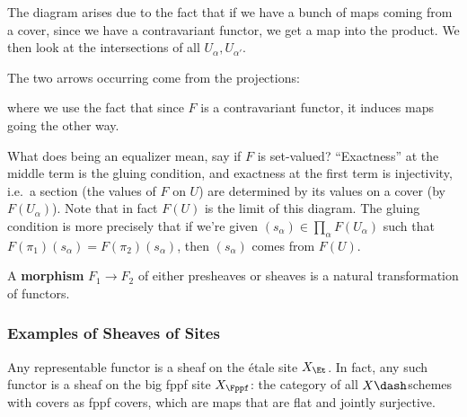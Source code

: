 \begin{remark}

The diagram arises due to the fact that if we have a bunch of maps
coming from a cover, since we have a contravariant functor, we get a map
into the product. We then look at the intersections of all
\(U_{\alpha}, U_{\alpha'}\).

The two arrows occurring come from the projections:

\begin{center}
\end{center}

where we use the fact that since \(F\) is a contravariant functor, it
induces maps going the other way.

What does being an equalizer mean, say if \(F\) is set-valued?
``Exactness'' at the middle term is the gluing condition, and exactness
at the first term is injectivity, i.e.~a section (the values of \(F\) on
\(U\)) are determined by its values on a cover (by \(F(U_\alpha)\)).
Note that in fact \(F(U)\) is the limit of this diagram. The gluing
condition is more precisely that if we're given
\((s_\alpha) \in \prod_\alpha F(U_\alpha)\) such that
\(F(\pi_1)(s_\alpha) = F(\pi_2)(s_\alpha)\), then \((s_\alpha)\) comes
from \(F(U)\).

\end{remark}

\begin{definition}

A \textbf{morphism} \(F_1\to F_2\) of either presheaves or sheaves is a
natural transformation of functors.

\end{definition}

\hypertarget{examples-of-sheaves-of-sites}{%
\subsubsection{Examples of Sheaves of
Sites}\label{examples-of-sheaves-of-sites}}

\begin{theorem}[?]

Any representable functor is a sheaf on the étale site \(X_{\Et}\). In
fact, any such functor is a sheaf on the big fppf site \(X_{\Fppf}\):
the category of all \(X\dash\)schemes with covers as fppf covers, which
are maps that are flat and jointly surjective.

\end{theorem}

